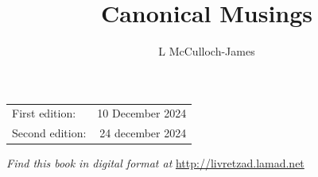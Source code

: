\documentclass[a5paper,11pt,twoside,onecolumn,openany,extrafontsizes,final]{memoir}%
\title{Canonical Musings}
\author{\Huge L McCulloch-James}
\begin{document}
\pagestyle{empty}
% 
% 
\titleM
\vspace{2\baselineskip}
\vspace{\baselineskip}
\begin{center}
\begin {tabular}{lr}
First edition: & 10 December 2024\\
Second edition: & 24 december 2024\\
\end{tabular}
\end{center}
\vspace{2\baselineskip}
\doclicenseThis
\vspace*{\baselineskip}
\centerline{\textit{Find this book in digital format at
} \url{http://livretzad.lamad.net}} 
\clearpage

\frontmatter
\pagestyle{mystyle}
% 
\clearpage
\tableofcontents*

\mainmatter
\sloppybottom
% 


























\end{document}
